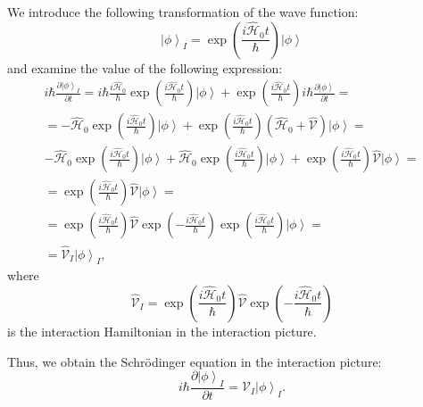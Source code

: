 We introduce the following transformation of the wave function:
\[
\left| \phi \right>_I = 
\exp{\left(\frac{i \hat{\mathcal{H}}_0 t}{\hbar}\right)}
\left| \phi \right>
\]
and examine the value of the following expression:
\begin{eqnarray}
i \hbar \frac{\partial \left| \phi \right>_I}{\partial t} = 
i \hbar \frac{i \hat{\mathcal{H}}_0}{\hbar} 
\exp{\left(\frac{i \hat{\mathcal{H}}_0 t}{\hbar}\right)}
\left| \phi \right> +
\exp{\left(\frac{i \hat{\mathcal{H}}_0 t}{\hbar}\right)}
i \hbar \frac{\partial \left| \phi \right>}{\partial t} = 
\nonumber \\
= - \hat{\mathcal{H}}_0 
\exp{\left(\frac{i \hat{\mathcal{H}}_0 t}{\hbar}\right)}
\left| \phi \right> +
\exp{\left(\frac{i \hat{\mathcal{H}}_0 t}{\hbar}\right)}
\left(
\hat{\mathcal{H}}_0 + \hat{\mathcal{V}}
\right)
\left| \phi \right> =
\nonumber \\ 
- \hat{\mathcal{H}}_0 
\exp{\left(\frac{i \hat{\mathcal{H}}_0 t}{\hbar}\right)}
\left| \phi \right> +
\hat{\mathcal{H}}_0 
\exp{\left(\frac{i \hat{\mathcal{H}}_0 t}{\hbar}\right)}
\left| \phi \right>
+
\exp{\left(\frac{i \hat{\mathcal{H}}_0 t}{\hbar}\right)}
 \hat{\mathcal{V}}
\left| \phi \right> =
\nonumber \\
= 
\exp{\left(\frac{i \hat{\mathcal{H}}_0 t}{\hbar}\right)}
 \hat{\mathcal{V}}
\left| \phi \right> = 
\nonumber \\
= 
\exp{\left(\frac{i \hat{\mathcal{H}}_0 t}{\hbar}\right)}
 \hat{\mathcal{V}}
\exp{\left( - \frac{i \hat{\mathcal{H}}_0 t}{\hbar}\right)}
\exp{\left(\frac{i \hat{\mathcal{H}}_0 t}{\hbar}\right)}
\left| \phi \right> = 
\nonumber \\
= 
 \hat{\mathcal{V}}_I \left| \phi \right>_I,
\nonumber
\end{eqnarray}
where 
\begin{equation}
\hat{\mathcal{V}}_I = 
\exp{\left(\frac{i \hat{\mathcal{H}}_0 t}{\hbar}\right)}
 \hat{\mathcal{V}}
\exp{\left( - \frac{i \hat{\mathcal{H}}_0 t}{\hbar}\right)}
\label{eqAddWaveFunc_VInter}
\end{equation} 
is the interaction Hamiltonian in the interaction picture.

Thus, we obtain the Schrödinger equation in the interaction picture:
\begin{equation}
i \hbar \frac{\partial \left| \phi \right>_I}{\partial t} = \hat{\mathcal{V}}_I
\left| \phi \right>_I.
\label{eqAddWaveFunc_ShredingerInter}
\end{equation}


